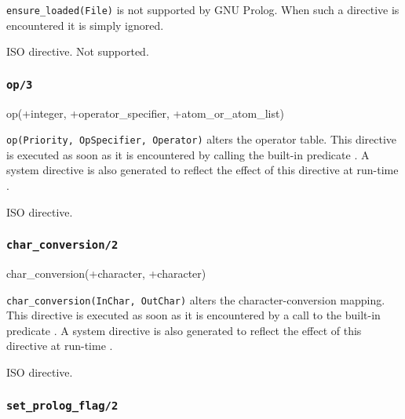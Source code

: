 \Description

\texttt{ensure\_loaded(File)} is not supported by GNU Prolog. When such a
directive is encountered it is simply ignored.

\Portability

ISO directive. Not supported.

\subsubsection{\texttt{op/3}}
\label{op/3}

\begin{TemplatesOneCol}
op(+integer, +operator\_specifier, +atom\_or\_atom\_list)

\end{TemplatesOneCol}

\Description

\texttt{op(Priority, OpSpecifier, Operator)} alters the operator table. This
directive is executed as soon as it is encountered by calling the built-in
predicate  . A system
directive is also generated to reflect the effect of this directive at
run-time .

\Portability

ISO directive.

\subsubsection{\texttt{char\_conversion/2}}

\begin{TemplatesOneCol}
char\_conversion(+character, +character)

\end{TemplatesOneCol}

\Description

\texttt{char\_conversion(InChar, OutChar)} alters the character-conversion
mapping. This directive is executed as soon as it is encountered by a call
to the built-in predicate 
. A system directive is also generated to reflect
the effect of this directive at run-time .

\Portability

ISO directive.

\subsubsection{\texttt{set\_prolog\_flag/2}}

